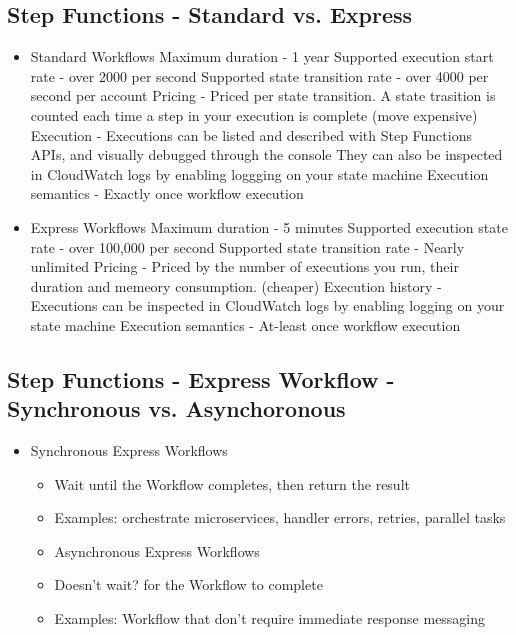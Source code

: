 \subsection{Step Functions - Standard vs. Express}
\begin{itemize}
    \item Standard Workflows
    Maximum duration - 1 year
    Supported execution start rate - over 2000 per second
    Supported state transition rate - over 4000 per second per account
    Pricing - Priced per state transition. A state trasition is counted each time a step in your execution is complete (move expensive)
    Execution - Executions can be listed and described with Step Functions APIs, and visually debugged through the console They can also be inspected in CloudWatch logs by enabling loggging on your state machine
    Execution semantics - Exactly once workflow execution

    \item Express Workflows
    Maximum duration - 5 minutes
    Supported execution state rate - over 100,000 per second
    Supported state transition rate - Nearly unlimited
    Pricing - Priced by the number of executions you run, their duration and memeory consumption. (cheaper)
    Execution history - Executions can be inspected in CloudWatch logs by enabling logging on your state machine
    Execution semantics - At-least once workflow execution
\end{itemize}

\subsection{Step Functions - Express Workflow - Synchronous vs. Asynchoronous}
\begin{itemize}
    \item Synchronous Express Workflows
    \begin{itemize}
        \item Wait until the Workflow completes, then return the result
        \item Examples: orchestrate microservices, handler errors, retries, parallel tasks
    \end{itemize}
    \begin{itemize}
        \item Asynchronous Express Workflows
        \item Doesn't wait? for the Workflow to complete
        \item Examples: Workflow that don't require immediate response messaging
    \end{itemize}
\end{itemize}


